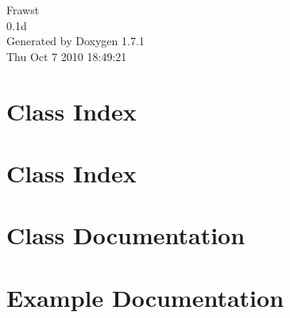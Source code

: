 \documentclass[a4paper]{book}
\begin{document}
\hypersetup{pageanchor=false}
\begin{titlepage}
\vspace*{7cm}
\begin{center}
{\Large Frawst \\[1ex]\large 0.1d }\\
\vspace*{1cm}
{\large Generated by Doxygen 1.7.1}\\
\vspace*{0.5cm}
{\small Thu Oct 7 2010 18:49:21}\\
\end{center}
\end{titlepage}
\clearemptydoublepage
{}
\tableofcontents
\clearemptydoublepage
{}
\hypersetup{pageanchor=true}
\chapter{Class Index}

\chapter{Class Index}

\chapter{Class Documentation}





















































\chapter{Example Documentation}


\printindex
\end{document}
